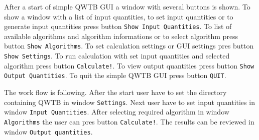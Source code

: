 \documentclass[12pt,a4paper,oneside]{report} %
\begin{document}
After a start of simple QWTB GUI a window with several buttons is shown. To show
a window with a list of input quantities, to set input quantities or to generate input quantities
press button {\tt Show Input Quantities}. To list of available algorithms and algorithm informations
or to select algorithm press button
{\tt Show Algorithms}. To set calculation settings or GUI settings pres  button {\tt Show Settings}.
To run calculation with set input quantities and selected algorithm press  button {\tt Calculate!}.
To view output quantities press button {\tt Show Output Quantities}. To quit the simple QWTB
GUI press button {\tt QUIT}.

The work flow is following. After the start user have to set the directory containing QWTB in window
{\tt Settings}. Next user have to set input quantities in window {\tt Input Quantities}. After selecting required
algorithm in window {\tt Algorithms} the user can pres button {\tt Calculate!}. The results can be
reviewed in window {\tt Output quantities}.


\printbibliography[title={Bilbiography},heading={bibnumbered}]
\end{document}
